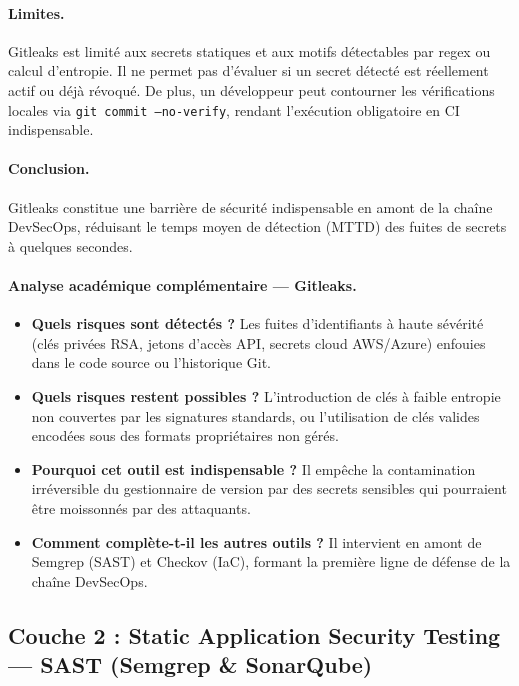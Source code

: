 \paragraph{Limites.}
Gitleaks est limité aux secrets statiques et aux motifs détectables par regex ou calcul d'entropie. Il ne permet pas d'évaluer si un secret détecté est réellement actif ou déjà révoqué. De plus, un développeur peut contourner les vérifications locales via \texttt{git commit --no-verify}, rendant l'exécution obligatoire en CI indispensable.

\paragraph{Conclusion.}
Gitleaks constitue une barrière de sécurité indispensable en amont de la chaîne DevSecOps, réduisant le temps moyen de détection (MTTD) des fuites de secrets à quelques secondes.

\paragraph{Analyse académique complémentaire — Gitleaks.}
\begin{itemize}
    \item \textbf{Quels risques sont détectés ?} Les fuites d'identifiants à haute sévérité (clés privées RSA, jetons d'accès API, secrets cloud AWS/Azure) enfouies dans le code source ou l'historique Git.
    \item \textbf{Quels risques restent possibles ?} L'introduction de clés à faible entropie non couvertes par les signatures standards, ou l'utilisation de clés valides encodées sous des formats propriétaires non gérés.
    \item \textbf{Pourquoi cet outil est indispensable ?} Il empêche la contamination irréversible du gestionnaire de version par des secrets sensibles qui pourraient être moissonnés par des attaquants.
    \item \textbf{Comment complète-t-il les autres outils ?} Il intervient en amont de Semgrep (SAST) et Checkov (IaC), formant la première ligne de défense de la chaîne DevSecOps.
\end{itemize}

\subsection{Couche 2 : Static Application Security Testing — SAST (Semgrep \& SonarQube)}

